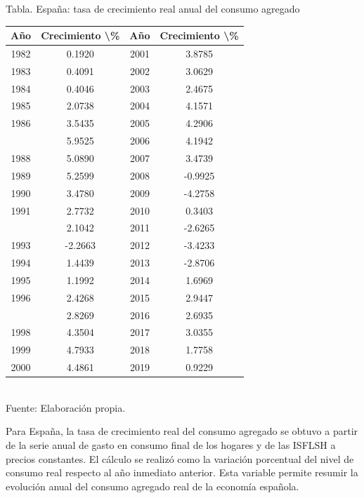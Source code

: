 \documentclass{article}\usepackage[]{graphicx}\usepackage[]{xcolor}
\begin{document}
\begin{center}
Tabla. España: tasa de crecimiento real anual del consumo agregado
\end{center}
\begin{center}

\begin{tabular}{cccc}
\toprule
Año & Crecimiento \textbackslash{}\% & Año & Crecimiento \textbackslash{}\%\\
\midrule
1982 & 0.1920 & 2001 & 3.8785\\
1983 & 0.4091 & 2002 & 3.0629\\
1984 & 0.4046 & 2003 & 2.4675\\
1985 & 2.0738 & 2004 & 4.1571\\
1986 & 3.5435 & 2005 & 4.2906\\
\addlinespace
1987 & 5.9525 & 2006 & 4.1942\\
1988 & 5.0890 & 2007 & 3.4739\\
1989 & 5.2599 & 2008 & -0.9925\\
1990 & 3.4780 & 2009 & -4.2758\\
1991 & 2.7732 & 2010 & 0.3403\\
\addlinespace
1992 & 2.1042 & 2011 & -2.6265\\
1993 & -2.2663 & 2012 & -3.4233\\
1994 & 1.4439 & 2013 & -2.8706\\
1995 & 1.1992 & 2014 & 1.6969\\
1996 & 2.4268 & 2015 & 2.9447\\
\addlinespace
1997 & 2.8269 & 2016 & 2.6935\\
1998 & 4.3504 & 2017 & 3.0355\\
1999 & 4.7933 & 2018 & 1.7758\\
2000 & 4.4861 & 2019 & 0.9229\\
\bottomrule
\end{tabular}
\\[0.3em]
{\footnotesize Fuente: Elaboración propia.}
\end{center}


Para España, la tasa de crecimiento real del consumo agregado se obtuvo a partir de la serie anual de gasto en consumo final de los hogares y de las ISFLSH a precios constantes. El cálculo se realizó como la variación porcentual del nivel de consumo real respecto al año inmediato anterior. Esta variable permite resumir la evolución anual del consumo agregado real de la economía española.
\end{document}
